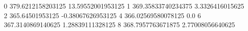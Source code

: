0 379.6212158203125 13.59552001953125
1 369.35833740234375 3.3326416015625
2 365.64501953125 -0.38067626953125
4 366.02569580078125 0.0
6 367.3140869140625 1.28839111328125
8 368.7957763671875 2.77008056640625
